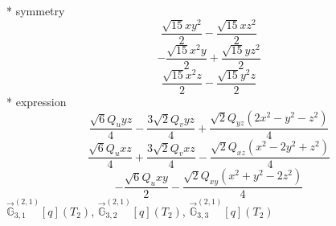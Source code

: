 \documentclass[fleqn,8pt]{jsarticle}
\begin{document}
\noindent\quad ** symmetry
\begin{dmath*}
\frac{\sqrt{15} x y^{2}}{2} - \frac{\sqrt{15} x z^{2}}{2}
\end{dmath*}
\begin{dmath*}
- \frac{\sqrt{15} x^{2} y}{2} + \frac{\sqrt{15} y z^{2}}{2}
\end{dmath*}
\begin{dmath*}
\frac{\sqrt{15} x^{2} z}{2} - \frac{\sqrt{15} y^{2} z}{2}
\end{dmath*}
\noindent\quad ** expression
\begin{dmath*}
\frac{\sqrt{6} Q_{u} y z}{4} - \frac{3 \sqrt{2} Q_{v} y z}{4} + \frac{\sqrt{2} Q_{yz} \left(2 x^{2} - y^{2} - z^{2}\right)}{4}
\end{dmath*}
\begin{dmath*}
\frac{\sqrt{6} Q_{u} x z}{4} + \frac{3 \sqrt{2} Q_{v} x z}{4} - \frac{\sqrt{2} Q_{xz} \left(x^{2} - 2 y^{2} + z^{2}\right)}{4}
\end{dmath*}
\begin{dmath*}
- \frac{\sqrt{6} Q_{u} x y}{2} - \frac{\sqrt{2} Q_{xy} \left(x^{2} + y^{2} - 2 z^{2}\right)}{4}
\end{dmath*}
\noindent\quad $\vec{\mathbb{G}}_{3,1}^{(2,1)}[q](T_{2})$, $\vec{\mathbb{G}}_{3,2}^{(2,1)}[q](T_{2})$, $\vec{\mathbb{G}}_{3,3}^{(2,1)}[q](T_{2})$
\end{document}
